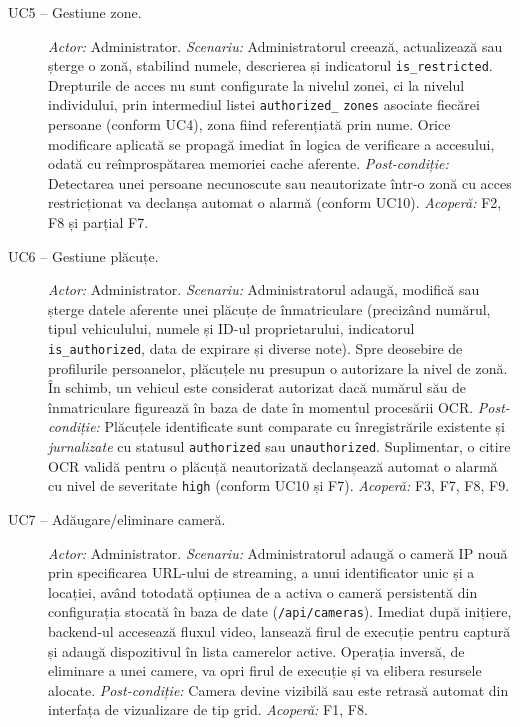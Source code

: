 \documentclass[../../main.tex]{subfiles}
\begin{document}
\begin{description}
    \item[UC5 -- Gestiune zone.]  \textit{Actor:} Administrator. \textit{Scenariu:} Administratorul creează, actualizează sau șterge o zonă, stabilind numele, descrierea și indicatorul \texttt{is\_restricted}. Drepturile de acces nu sunt configurate la nivelul zonei, ci la nivelul individului, prin intermediul listei \texttt{authorized\_} \texttt{zones} asociate fiecărei persoane (conform UC4), zona fiind referențiată prin nume. Orice modificare aplicată se propagă imediat în logica de verificare a accesului, odată cu reîmprospătarea memoriei cache aferente. \textit{Post-condiție:} Detectarea unei persoane necunoscute sau neautorizate într-o zonă cu acces restricționat va declanșa automat o alarmă (conform UC10). \textit{Acoperă:} F2, F8 și parțial F7.

    \item[UC6 -- Gestiune plăcuțe.] \textit{Actor:} Administrator. \textit{Scenariu:} Administratorul adaugă, modifică sau șterge datele aferente unei plăcuțe de înmatriculare (precizând numărul, tipul vehiculului, numele și ID-ul proprietarului, indicatorul \texttt{is\_authorized}, data de expirare și diverse note). Spre deosebire de profilurile persoanelor, plăcuțele nu presupun o autorizare la nivel de zonă. În schimb, un vehicul este considerat autorizat dacă numărul său de înmatriculare figurează în baza de date în momentul procesării OCR. \textit{Post-condiție:} Plăcuțele identificate sunt comparate cu înregistrările existente și \emph{jurnalizate} cu statusul \texttt{authorized} sau \texttt{unauthorized}. Suplimentar, o citire OCR validă pentru o plăcuță neautorizată declanșează automat o alarmă cu nivel de severitate \texttt{high} (conform UC10 și F7). \textit{Acoperă:} F3, F7, F8, F9.

    \item[UC7 -- Adăugare/eliminare cameră.] \textit{Actor:} Administrator. \textit{Scenariu:} Administratorul adaugă o cameră IP nouă prin specificarea URL-ului de streaming, a unui identificator unic și a locației, având totodată opțiunea de a activa o cameră persistentă din configurația stocată în baza de date (\texttt{/api/cameras}). Imediat după inițiere, backend-ul accesează fluxul video, lansează firul de execuție pentru captură și adaugă dispozitivul în lista camerelor active. Operația inversă, de eliminare a unei camere, va opri firul de execuție și va elibera resursele alocate. \textit{Post-condiție:} Camera devine vizibilă sau este retrasă automat din interfața de vizualizare de tip grid. \textit{Acoperă:} F1, F8.


\end{description}
\end{document}

